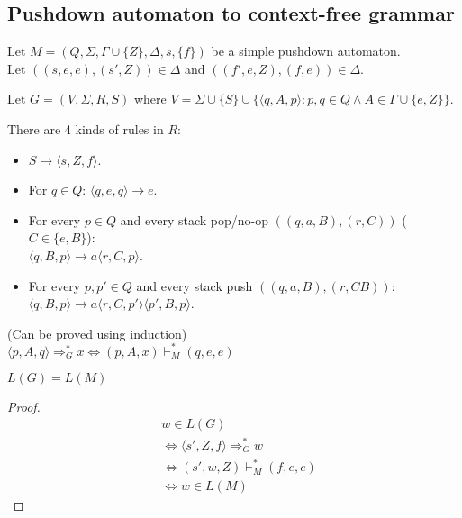 \subsection{Pushdown automaton to context-free grammar}

Let $M = (Q, \Sigma, \Gamma \cup \{Z\}, \Delta, s, \{f\})$ be a simple pushdown automaton.\\
Let $((s,e,e), (s',Z)) \in \Delta$ and $((f',e,Z), (f,e)) \in \Delta$.

Let $G = (V, \Sigma, R, S)$ where
$V = \Sigma \cup \{S\} \cup \{\langle q, A, p \rangle: p, q \in Q \wedge A \in \Gamma \cup \{e, Z\}\}$.

There are 4 kinds of rules in $R$:
\begin{itemize}
\item $S \rightarrow \langle s, Z, f \rangle$.
\item For $q \in Q$: $\langle q, e, q \rangle \rightarrow e$.
\item For every $p \in Q$ and every stack pop/no-op $((q,a,B), (r,C))$ ($C \in \{e, B\}$):\\
$\langle q, B, p \rangle \rightarrow a \langle r, C, p \rangle$.
\item For every $p, p' \in Q$ and every stack push $((q,a,B), (r,CB))$:\\
$\langle q, B, p \rangle \rightarrow a \langle r, C, p' \rangle \langle p', B, p \rangle$.
\end{itemize}

\begin{lemma}(Can be proved using induction)\\
$\langle p, A, q \rangle \Rightarrow_G^* x \iff (p, A, x) \vdash_M^* (q, e, e)$
\end{lemma}
\begin{theorem}$L(G) = L(M)$\end{theorem}
\begin{proof}
\begin{align*}
& w \in L(G)
\\ &\iff \langle s', Z, f \rangle \Rightarrow_G^* w
\\ &\iff (s', w, Z) \vdash_M^* (f, e, e)
\\ &\iff w \in L(M)
\end{align*}
\end{proof}


